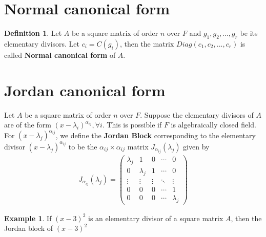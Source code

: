 \documentclass{article}
\theoremstyle{definition}
\newtheorem{defn}[thm]{Definition}
\newtheorem{exmp}[thm]{Example}
\theoremstyle{remark}
\begin{document}
\section{Normal canonical form}

\begin{defn}
Let $A$ be a square matrix of order $n$ over $F$ and $g_1,g_2,...,g_r$ be its elementary divisors. Let $c_i=C(g_i)$, then the matrix $Diag(c_1,c_2,...,c_r)$ is called \textbf{Normal canonical form} of $A$.
\end{defn}
\section{Jordan canonical form}
Let $A$ be a square matrix of order $n$ over $F$. Suppose the elementary divisors of $A$ are of the form $(x-\lambda_i)^{\alpha_{ij}}, \forall i$. This is  possible if $F$ is algebraically closed field. For $(x-\lambda_j)^{\alpha_{ij}}$, we define the \textbf{Jordan Block} corresponding to the elementary divisor $(x-\lambda_j)^{\alpha_{ij}}$ to be the $\alpha_{ij}\times\alpha_{ij}$ matrix $J_{\alpha_{ij}}(\lambda_j)$ given by
\begin{align}
  J_{\alpha_{ij}}(\lambda_j)= \left(
    \begin{matrix}
      \lambda_j & 1 & 0 &   \cdots & 0 \\
      0 & \lambda_j & 1&  \cdots & 0 \\
      \vdots & \vdots & \vdots &   \ddots & \vdots \\
      0 & 0 & 0 & \cdots & 1 \\
      0 & 0 & 0 & \cdots & \lambda_j
    \end{matrix}
    \right)
\end{align}

\begin{exmp}
If $(x-3)^2$ is an elementary divisor of a square matrix $A$, then the Jordan block of $(x-3)^2$
\end{exmp}
\end{document}
